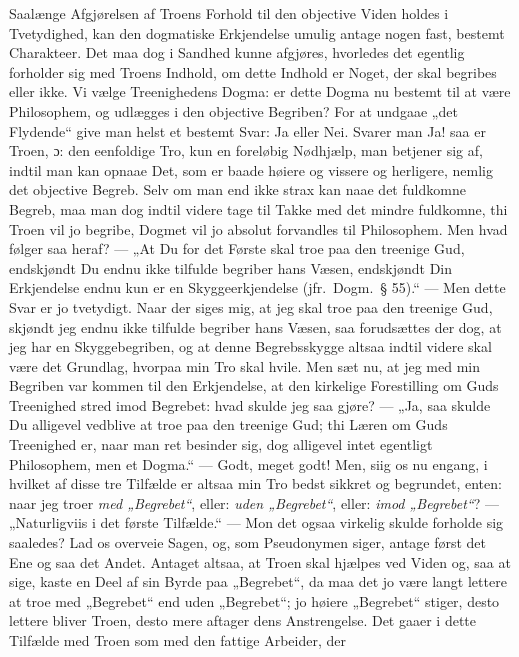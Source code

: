 Saalænge Afgjørelsen af Troens Forhold til den objective Viden
holdes i Tvetydighed, kan den dogmatiske Erkjendelse umulig antage
nogen fast, bestemt Charakteer. Det maa dog i Sandhed kunne
afgjøres, hvorledes det egentlig forholder sig med Troens Indhold,
om dette Indhold er Noget, der skal begribes eller ikke. Vi vælge
Treenighedens Dogma: er dette Dogma nu bestemt til at være
Philosophem, og udlægges i den objective Begriben? For at undgaae
„det Flydende“ give man helst et bestemt Svar: Ja eller Nei.
Svarer man Ja! saa er Troen, ɔ: den eenfoldige Tro, kun en
foreløbig Nødhjælp, man betjener sig af, indtil man kan opnaae
Det, som er baade høiere og vissere og herligere, nemlig det
objective Begreb. Selv om man end ikke strax kan naae det
fuldkomne Begreb, maa man dog indtil videre tage til Takke med det
mindre fuldkomne, thi Troen vil jo begribe, Dogmet vil jo absolut
forvandles til Philosophem. Men hvad følger saa heraf? --- „At Du
for det Første skal troe paa den treenige Gud, endskjøndt Du endnu
ikke tilfulde begriber hans Væsen, endskjøndt Din Erkjendelse
endnu kun er en Skyggeerkjendelse (jfr.\ Dogm.\ § 55).“ --- Men
dette Svar er
 jo tvetydigt. Naar der siges mig, at jeg skal troe paa den
treenige Gud, skjøndt jeg endnu ikke tilfulde begriber hans Væsen,
saa forudsættes der dog, at jeg har en Skyggebegriben, og at denne
Begrebsskygge altsaa indtil videre skal være det Grundlag, hvorpaa
min Tro skal hvile. Men sæt nu, at jeg med min Begriben var kommen
til den Erkjendelse, at den kirkelige Forestilling om Guds
Treenighed stred imod Begrebet: hvad skulde jeg saa gjøre? ---
„Ja, saa skulde Du alligevel vedblive at troe paa den treenige
Gud; thi Læren om Guds Treenighed er, naar man ret besinder sig,
dog alligevel intet egentligt Philosophem, men et Dogma.“ ---
Godt, meget godt! Men, siig os nu engang, i hvilket af disse tre
Tilfælde er altsaa min Tro bedst sikkret og begrundet, enten: naar
jeg troer \emph{med „Begrebet“}, eller: \emph{uden „Begrebet“},
eller: \emph{imod „Begrebet“}? --- „Naturligviis i det første
Tilfælde.“ --- Mon det ogsaa virkelig skulde forholde sig
saaledes? Lad os overveie Sagen, og, som Pseudonymen siger, antage
først det Ene og saa det Andet. Antaget altsaa, at Troen skal
hjælpes ved Viden og, saa at sige, kaste en Deel af sin Byrde paa
„Begrebet“, da maa det jo være langt lettere at troe med
„Begrebet“ end uden „Begrebet“; jo høiere „Begrebet“ stiger, desto
lettere bliver Troen, desto mere aftager dens Anstrengelse. Det
gaaer i dette Tilfælde med Troen som med den fattige Arbeider, der
